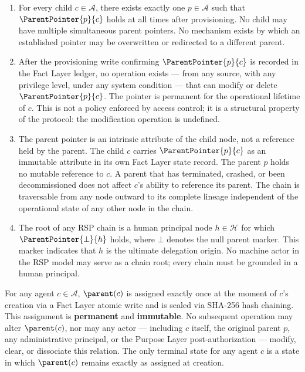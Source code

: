 \begin{enumerate}
    \item[(P1) \textbf{Uniqueness}] For every child $c \in \mathcal{A}$, there exists exactly one $p \in \mathcal{A}$ such that $\ParentPointer{p}{c}$ holds at all times after provisioning. No child may have multiple simultaneous parent pointers. No mechanism exists by which an established pointer may be overwritten or redirected to a different parent.
    \item[(P2) \textbf{Immutability}] After the provisioning write confirming $\ParentPointer{p}{c}$ is recorded in the Fact Layer ledger, no operation exists --- from any source, with any privilege level, under any system condition --- that can modify or delete $\ParentPointer{p}{c}$. The pointer is permanent for the operational lifetime of $c$. This is not a policy enforced by access control; it is a structural property of the protocol: the modification operation is undefined.
    \item[(P3) \textbf{Directionality}] The parent pointer is an intrinsic attribute of the child node, not a reference held by the parent. The child $c$ carries $\ParentPointer{p}{c}$ as an immutable attribute in its own Fact Layer state record. The parent $p$ holds no mutable reference to $c$. A parent that has terminated, crashed, or been decommissioned does not affect $c$'s ability to reference its parent. The chain is traversable from any node outward to its complete lineage independent of the operational state of any other node in the chain.
    \item[(P4) \textbf{Human Anchor Termination}] The root of any RSP chain is a human principal node $h \in \mathcal{H}$ for which $\ParentPointer{\bot}{h}$ holds, where $\bot$ denotes the null parent marker. This marker indicates that $h$ is the ultimate delegation origin. No machine actor in the RSP model may serve as a chain root; every chain must be grounded in a human principal.
\end{enumerate}

\begin{invariant}
\label{inv:pp_immutability}
For any agent $c \in \mathcal{A}$, $\parent(c)$ is assigned exactly once at the moment of $c$'s creation via a Fact Layer atomic write and is sealed via SHA-256 hash chaining. This assignment is \textbf{permanent} and \textbf{immutable}. No subsequent operation may alter $\parent(c)$, nor may any actor --- including $c$ itself, the original parent $p$, any administrative principal, or the Purpose Layer post-authorization --- modify, clear, or dissociate this relation. The only terminal state for any agent $c$ is a state in which $\parent(c)$ remains exactly as assigned at creation.
\end{invariant}

